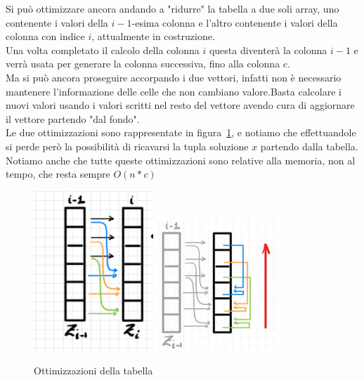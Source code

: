 \documentclass[a4paper]{article}
\begin{document}
Si può ottimizzare ancora andando a "ridurre" la tabella a due soli array, uno contenente i valori della $i-1$-esima colonna e l'altro contenente i valori della colonna con indice $i$, attualmente in costruzione.\\
Una volta completato il calcolo della colonna $i$ questa diventerà la colonna $i-1$ e verrà usata per generare la colonna successiva, fino alla colonna $c$.\\
Ma si può ancora proseguire accorpando i due vettori, infatti non è necessario mantenere l'informazione delle celle che non cambiano valore.Basta calcolare i nuovi valori usando i valori scritti nel resto del vettore avendo cura di aggiornare il vettore partendo "dal fondo".\\
Le due ottimizzazioni sono rappresentate in figura~\ref{FIG:D2_ottimizzazioni}, e notiamo che effettuandole si perde però la possibilità di ricavarsi la tupla soluzione $x$ partendo dalla tabella.
Notiamo anche che tutte queste ottimizzazioni sono relative alla memoria, non al tempo, che resta sempre $O(n*c)$\\
\begin{figure}[!ht]
\centering
\includegraphics[width=0.4\textwidth]{./img/D2_2vettori}
\includegraphics[width=0.4\textwidth,height=0.32\textheight]{./img/D2_1vettore}
\caption{Ottimizzazioni della tabella} \label{FIG:D2_ottimizzazioni}
\end{figure}\\
\end{document}
